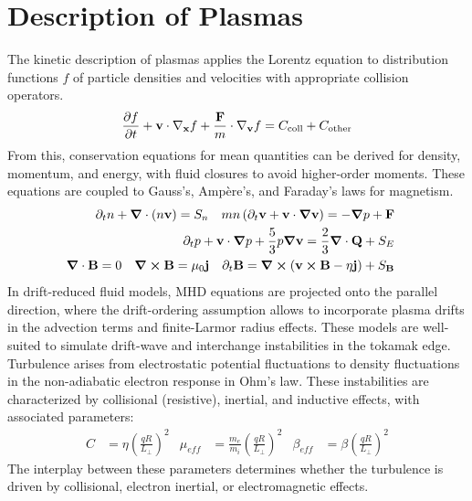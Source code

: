 \chapter{Description of Plasmas}
\label{chap:PlasmaSimulations}

\vfill
\begin{chaptersummarybox}
	The kinetic description of plasmas applies the Lorentz equation to distribution functions $f$ of particle densities and velocities with appropriate collision operators.
	\begin{equation*}
		\pdv{f}{t} + \mathbf{v} \cdot \nabla_{\mathbf{x}} f + \frac{\mathbf{F}}{m} \cdot \nabla_{\mathbf{v}} f = C_{\text{coll}} + C_{\text{other}}
	\end{equation*}
	From this, conservation equations for mean quantities can be derived for density, momentum, and energy, with fluid closures to avoid higher-order moments. These equations are coupled to Gauss's, Ampère's, and Faraday's laws for magnetism.
	\begin{align*}
	\begin{aligned}
		\partial_t n + \grad\cdot\left(n\mathbf{v}\right) &= S_n & 
		mn\left(\partial_t \textbf{v} + \textbf{v}\cdot\grad\textbf{v} \right) &= -\grad p + \textbf{F} 	
		\end{aligned}\\\begin{aligned}
		\partial_t p+\textbf{v}\cdot\grad p + \frac{5}{3}p\grad\textbf{v} &= \frac{2}{3}\grad\cdot\textbf{Q}+S_E 
		\end{aligned}\\\begin{aligned}
		\grad\cdot\textbf{B} &= 0 & \grad\cross\textbf{B} &= \mu_0 \textbf{j} & \partial_t \textbf{B} &= \grad\cross\left(\textbf{v}\cross\textbf{B} - \eta\textbf{j}\right) + S_\textbf{B}
	\end{aligned}
	\end{align*}
	In drift-reduced fluid models, MHD equations are projected onto the parallel direction, where the drift-ordering assumption allows to incorporate plasma drifts  in the advection terms and finite-Larmor radius effects. These models are well-suited to simulate drift-wave and interchange instabilities in the tokamak edge. Turbulence arises from electrostatic potential fluctuations  to density fluctuations in the non-adiabatic electron response in Ohm's law. These instabilities are characterized by collisional (resistive), inertial, and inductive effects, with associated parameters:
	\begin{align*}
		C &= \eta\left(\frac{qR}{L_\perp}\right)^2	&
		\mu_{eff} &= \frac{m_e}{m_i}\left(\frac{qR}{L_\perp}\right)^2 &
		\beta_{eff} &= \beta\left(\frac{qR}{L_\perp}\right)^2
	\end{align*}
	The interplay between these parameters determines whether the turbulence is driven by collisional, electron inertial, or electromagnetic effects.
\end{chaptersummarybox}
\vfill
\newpage



